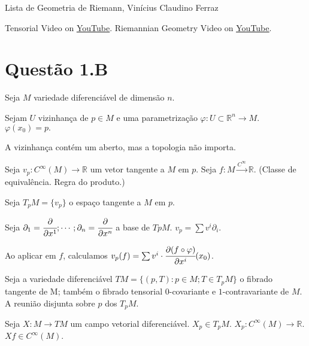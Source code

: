 \documentclass[10pt,a4paper]{article}
\date{}
\begin{document}
	\Large

	\begin{center}
		Lista de Geometria de Riemann, Vin\'icius Claudino Ferraz
	\end{center}

	\normalsize

Tensorial Video on \href{https://www.youtube.com/watch?v=mmzqmIcX7xo}{\color{blue}\underline{YouTube}}. Riemannian Geometry Video on \href{https://www.youtube.com/watch?v=Z3IXeWvEEa4}{\color{blue}\underline{YouTube}}.

	\section{Quest\~ao 1.B}
		\begin{flushright}
		\end{flushright}

		Seja $M$ variedade diferenci\'avel de dimens\~ao $n$.

		Sejam $U$ vizinhan\c{c}a de $p \in M$ e uma parametriza\c{c}\~ao $\varphi: U \subset \mathbb{R}^n \rightarrow M$. $\varphi(x_0) = p.$

		A vizinhan\c{c}a cont\'em um aberto, mas a topologia n\~ao importa.

		Seja $v_p : C^\infty(M) \rightarrow \mathbb{R}$ um vetor tangente a $M$ em $p$. Seja $f : M \stackrel{C^\infty}{\longrightarrow} \mathbb{R}$. (Classe de equival\^encia. Regra do produto.)

		Seja $T_pM = \{v_p \}$ o espa\c{c}o tangente a $M$ em $p$.

		Seja $\partial_1 = \cfrac{\partial}{\partial x^1} ; \cdots ; \partial_n = \cfrac{\partial}{\partial x^n}$ a base de $TpM$. $v_p = \sum v^i \partial_i$.

		Ao aplicar em $f$, calculamos $v_p(f) = \sum v^i \cdot \cfrac{\partial (f \circ \varphi)}{\partial x^i} (x_0)$.

		Seja a variedade diferenci\'avel $TM = \{ (p, T): p \in M ; T \in T_pM \}$ o fibrado tangente de M; tamb\'em o fibrado tensorial $0$-covariante e $1$-contravariante de $M$. A reuni\~ao disjunta sobre $p$ dos $T_pM$.

		Seja $X: M \rightarrow TM$ um campo vetorial diferenci\'avel. $X_p \in T_pM$. $X_p : C^\infty(M) \rightarrow \mathbb{R}$. $Xf \in C^\infty(M)$.
\end{document}
